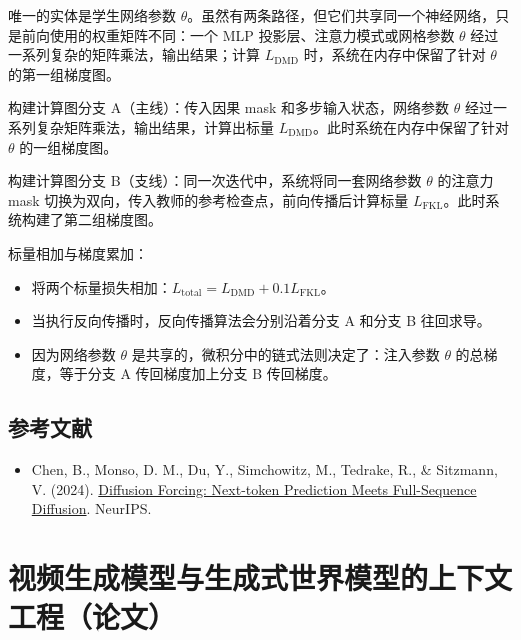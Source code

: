唯一的实体是学生网络参数 \(\theta\)。虽然有两条路径，但它们共享同一个神经网络，只是前向使用的权重矩阵不同：一个 MLP 投影层、注意力模式或网格参数 \(\theta\) 经过一系列复杂的矩阵乘法，输出结果；计算 \(L_{\mathrm{DMD}}\) 时，系统在内存中保留了针对 \(\theta\) 的第一组梯度图。

构建计算图分支 A（主线）：传入因果 mask 和多步输入状态，网络参数 \(\theta\) 经过一系列复杂矩阵乘法，输出结果，计算出标量 \(L_{\mathrm{DMD}}\)。此时系统在内存中保留了针对 \(\theta\) 的一组梯度图。

构建计算图分支 B（支线）：同一次迭代中，系统将同一套网络参数 \(\theta\) 的注意力 mask 切换为双向，传入教师的参考检查点，前向传播后计算标量 \(L_{\mathrm{FKL}}\)。此时系统构建了第二组梯度图。

标量相加与梯度累加：

\begin{itemize}
\tightlist
\item
  将两个标量损失相加：\(L_{\mathrm{total}}=L_{\mathrm{DMD}}+0.1L_{\mathrm{FKL}}\)。
\item
  当执行反向传播时，反向传播算法会分别沿着分支 A 和分支 B 往回求导。
\item
  因为网络参数 \(\theta\) 是共享的，微积分中的链式法则决定了：注入参数 \(\theta\) 的总梯度，等于分支 A 传回梯度加上分支 B 传回梯度。
\end{itemize}

\hypertarget{ux53c2ux8003ux6587ux732e-180}{%
\subsection{参考文献}\label{ux53c2ux8003ux6587ux732e-180}}

\begin{itemize}
\tightlist
\item
  Chen, B., Monso, D. M., Du, Y., Simchowitz, M., Tedrake, R., \& Sitzmann, V. (2024). \href{https://arxiv.org/abs/2407.01392}{Diffusion Forcing: Next-token Prediction Meets Full-Sequence Diffusion}. NeurIPS.
\end{itemize}

\clearpage

\hypertarget{ux89c6ux9891ux751fux6210ux6a21ux578bux4e0eux751fux6210ux5f0fux4e16ux754cux6a21ux578bux7684ux4e0aux4e0bux6587ux5de5ux7a0bux8bbaux6587}{%
\section{视频生成模型与生成式世界模型的上下文工程（论文）}\label{ux89c6ux9891ux751fux6210ux6a21ux578bux4e0eux751fux6210ux5f0fux4e16ux754cux6a21ux578bux7684ux4e0aux4e0bux6587ux5de5ux7a0bux8bbaux6587}}

